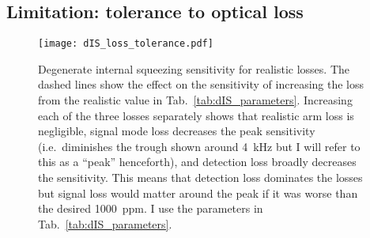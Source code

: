 


\subsection{Limitation: tolerance to optical loss}
\label{sec:dIS_optical_loss}

\begin{figure}
	\centering
	\texttt{[image: dIS\_loss\_tolerance.pdf]}
	\caption{Degenerate internal squeezing sensitivity for realistic losses. The dashed lines show the effect on the sensitivity of increasing the loss from the realistic value in Tab.~\ref{tab:dIS_parameters}. Increasing each of the three losses separately shows that realistic arm loss is negligible, signal mode loss decreases the peak sensitivity (i.e.\ diminishes the trough shown around 4~kHz but I will refer to this as a ``peak'' henceforth), and detection loss broadly decreases the sensitivity. This means that detection loss dominates the losses but signal loss would matter around the peak if it was worse than the desired 1000~ppm. I use the parameters in Tab.~\ref{tab:dIS_parameters}.}
	\label{fig:dIS_loss_tolerance}
\end{figure}

